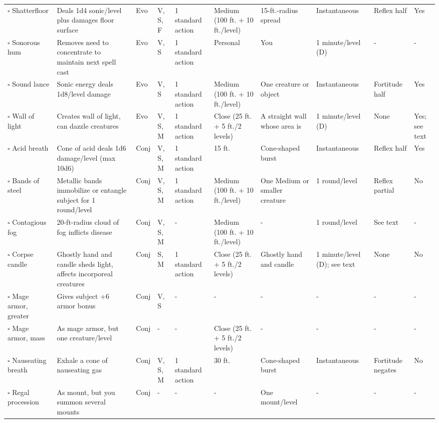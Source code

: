\documentclass[12pt, a4paper]{article}
\begin{document}
\begin{center}
\begin{longtable}[H]{ p{8em} p{15em} p{2em} p{5em} p{6em} p{6em} p{10em} p{6em} p{5em} p{2em} }
    \(\square\) Shatterfloor & Deals 1d4 sonic/level plus damages ﬂoor surface & Evo & V, S, F & 1 standard action & Medium (100 ft. + 10 ft./level) & 15-ft.-radius spread & Instantaneous & Reﬂex half & Yes\\
    \(\square\) Sonorous hum & Removes need to concentrate to maintain next spell cast & Evo & V, S & 1 standard action & Personal & You & 1 minute/level (D) & - & -\\
    \(\square\) Sound lance & Sonic energy deals 1d8/level damage & Evo & V, S & 1 standard action & Medium (100 ft. + 10 ft./level) & One creature or object & Instantaneous & Fortitude half & Yes\\
    \(\square\) Wall of light & Creates wall of light, can dazzle creatures & Evo & V, S, M & 1 standard action & Close (25 ft. + 5 ft./2 levels) & A straight wall whose area is  & 1 minute/level (D) & None & Yes; see text\\
    \(\square\) Acid breath & Cone of acid deals 1d6 damage/level (max 10d6) & Conj & V, S, M & 1 standard action & 15 ft. & Cone-shaped burst & Instantaneous & Reﬂex half & Yes\\
    \(\square\) Bands of steel & Metallic bands immobilize or entangle subject for 1 round/level & Conj & V, S, M & 1 standard action & Medium (100 ft. + 10 ft./level) & One Medium or smaller creature & 1 round/level & Reﬂex partial & No\\
    \(\square\) Contagious fog & 20-ft-radius cloud of fog inﬂicts disease & Conj & V, S, M & - & Medium (100 ft. + 10 ft./level) & - & 1 round/level & See text & -\\
    \(\square\) Corpse candle & Ghostly hand and candle sheds light, affects incorporeal creatures & Conj & S, M & 1 standard action & Close (25 ft. + 5 ft./2 levels) & Ghostly hand and candle & 1 minute/level (D); see text & None & No\\
    \(\square\) Mage armor, greater & Gives subject +6 armor bonus & Conj & V, S & - & - & - & - & - & -\\
    \(\square\) Mage armor, mass & As mage armor, but one creature/level & Conj & - & - & Close (25 ft. + 5 ft./2 levels) & - & - & - & -\\
    \(\square\) Nauseating breath & Exhale a cone of nauseating gas & Conj & V, S, M & 1 standard action & 30 ft. & Cone-shaped burst & Instantaneous & Fortitude negates & No\\
    \(\square\) Regal procession & As mount, but you summon several mounts & Conj & - & - & - & One mount/level & - & - & -\\

\end{longtable}
\end{center}
\end{document}

